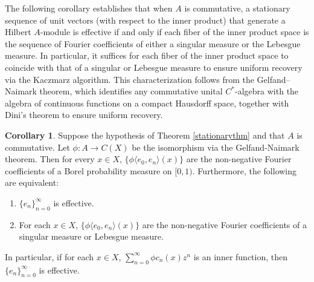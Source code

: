 \documentclass[11pt]{amsart}
\theoremstyle{definition}
\newtheorem{cor}{Corollary}[section]
\numberwithin{equation}{section}
\begin{document}
The following corollary establishes that when $A$ is commutative, a stationary sequence of unit vectors (with respect to the inner product) that generate a Hilbert 
$A$-module is effective if and only if each fiber of the inner product space is the sequence of Fourier coefficients of either a singular measure or the Lebesgue measure. In particular, it suffices for each fiber of the inner product space to coincide with that of a singular or Lebesgue measure to ensure uniform recovery via the Kaczmarz algorithm. This characterization follows from the Gelfand–Naimark theorem, which identifies any commutative unital $C^{*}$-algebra with the algebra of continuous functions on a compact Hausdorff space, together with Dini’s theorem to ensure uniform recovery.
\begin{cor}\label{stationarycomm}
Suppose the hypothesis of Theorem \ref{stationarythm} and that $A$ is commutative. Let $\phi: A\to C(X)$ be the isomorphism via the Gelfand-Naimark theorem. Then for every $x\in X$, $\{\phi \langle e_{0},e_{n}\rangle(x)\}$ are the non-negative Fourier coefficients of a Borel probability measure on $[0,1)$. Furthermore, the following are equivalent:
\begin{enumerate}
    \item $\{e_{n}\}_{n=0}^{\infty}$ is effective.
    \item For each $x\in X$, $\{\phi \langle e_{0},e_{n}\rangle(x)\}$ are the non-negative Fourier coefficients of a singular measure or Lebesgue measure.
\end{enumerate}
In particular, if for each $x\in X$,
$\sum_{n=0}^{\infty}\phi c_{n}(x)z^{n}$ is an inner function, then $\{e_{n}\}_{n=0}^{\infty}$ is effective.
\end{cor}
\end{document}
